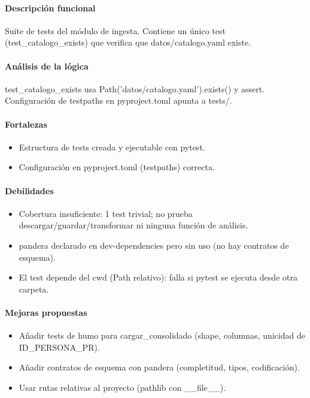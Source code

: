 \paragraph{Descripción funcional}
Suite de tests del módulo de ingesta. Contiene un único test (test\_catalogo\_exists) que verifica que datos/catalogo.yaml existe.

\paragraph{Análisis de la lógica}
test\_catalogo\_exists usa Path('datos/catalogo.yaml').exists() y assert. Configuración de testpaths en pyproject.toml apunta a tests/.

\paragraph{Fortalezas}
\begin{itemize}
  \item Estructura de tests creada y ejecutable con pytest.
  \item Configuración en pyproject.toml (testpaths) correcta.
\end{itemize}

\paragraph{Debilidades}
\begin{itemize}
  \item Cobertura insuficiente: 1 test trivial; no prueba descargar/guardar/transformar ni ninguna función de análisis.
  \item pandera declarado en dev-dependencies pero sin uso (no hay contratos de esquema).
  \item El test depende del cwd (Path relativo): falla si pytest se ejecuta desde otra carpeta.
\end{itemize}

\paragraph{Mejoras propuestas}
\begin{itemize}
  \item Añadir tests de humo para cargar\_consolidado (shape, columnas, unicidad de ID\_PERSONA\_PR).
  \item Añadir contratos de esquema con pandera (completitud, tipos, codificación).
  \item Usar rutas relativas al proyecto (pathlib con \_\_file\_\_).
\end{itemize}

